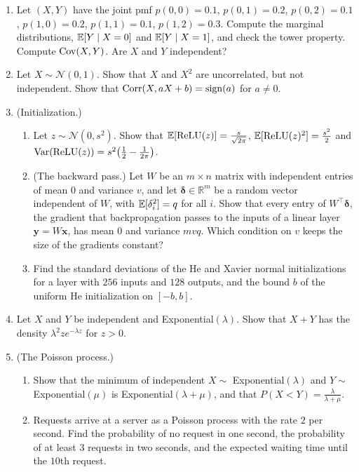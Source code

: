 \begin{enumerate}[leftmargin=*]
\begin{enumerate}[label=(\alph*)]
    \end{enumerate}
    \item\label{L4-ex4:joint-pmf} \homework{} Let $(X, Y)$ have the joint pmf $p(0, 0) = 0.1$, $p(0, 1) = 0.2$, $p(0, 2) = 0.1$, $p(1, 0) = 0.2$, $p(1, 1) = 0.1$, $p(1, 2) = 0.3$. Compute the marginal distributions, $\mathbb{E}[Y \mid X = 0]$ and $\mathbb{E}[Y \mid X = 1]$, and check the tower property. Compute $\operatorname{Cov}(X, Y)$. Are $X$ and $Y$ independent?
    \item Let $X \sim \mathcal{N}(0, 1)$. Show that $X$ and $X^2$ are uncorrelated, but not independent. Show that $\operatorname{Corr}(X, aX + b) = \operatorname{sign}(a)$ for $a \neq 0$.
    \item \homework{} (Initialization.)
    \begin{enumerate}[label=(\alph*)]
        \item Let $z \sim \mathcal{N}(0, s^2)$. Show that $\mathbb{E}[\mathrm{ReLU}(z)] = \frac{s}{\sqrt{2\pi}}$, $\mathbb{E}[\mathrm{ReLU}(z)^2] = \frac{s^2}{2}$ and $\operatorname{Var}(\mathrm{ReLU}(z)) = s^2\big(\frac{1}{2} - \frac{1}{2\pi}\big)$.
        \item (The backward pass.) Let $W$ be an $m \times n$ matrix with independent entries of mean $0$ and variance $v$, and let $\boldsymbol{\delta} \in \mathbb{R}^m$ be a random vector independent of $W$, with $\mathbb{E}[\delta_i^2] = q$ for all $i$. Show that every entry of $W^\top\boldsymbol{\delta}$, the gradient that backpropagation passes to the inputs of a linear layer $\mathbf{y} = W\mathbf{x}$, has mean $0$ and variance $mvq$. Which condition on $v$ keeps the size of the gradients constant?
        \item Find the standard deviations of the He and Xavier normal initializations for a layer with $256$ inputs and $128$ outputs, and the bound $b$ of the uniform He initialization on $[-b, b]$.
    \end{enumerate}
    \item Let $X$ and $Y$ be independent and Exponential$(\lambda)$. Show that $X + Y$ has the density $\lambda^2ze^{-\lambda z}$ for $z > 0$.
    \item (The Poisson process.)
    \begin{enumerate}[label=(\alph*)]
        \item Show that the minimum of independent $X \sim$ Exponential$(\lambda)$ and $Y \sim$ Exponential$(\mu)$ is Exponential$(\lambda + \mu)$, and that $P(X < Y) = \frac{\lambda}{\lambda + \mu}$.
        \item Requests arrive at a server as a Poisson process with the rate $2$ per second. Find the probability of no request in one second, the probability of at least $3$ requests in two seconds, and the expected waiting time until the $10$th request.

\end{enumerate}
\end{enumerate}
